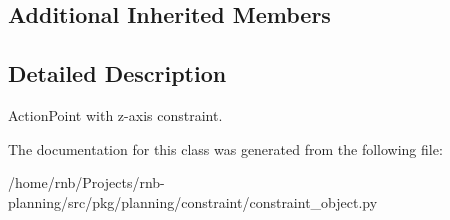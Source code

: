 \subsection*{Additional Inherited Members}


\subsection{Detailed Description}
Action\+Point with z-\/axis constraint. 

The documentation for this class was generated from the following file\+:\begin{DoxyCompactItemize}
\item 
/home/rnb/\+Projects/rnb-\/planning/src/pkg/planning/constraint/constraint\+\_\+object.\+py\end{DoxyCompactItemize}
